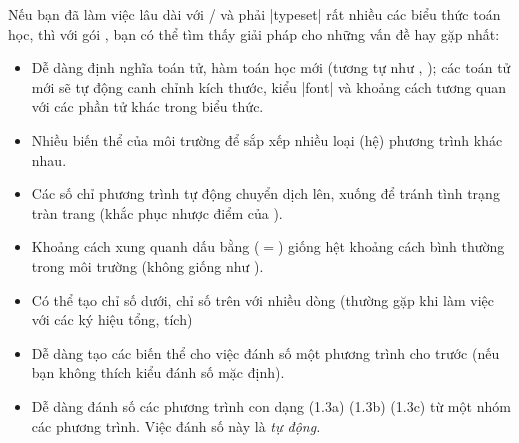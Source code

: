 \documentclass[11pt,leqno,titlepage,openany,oneside]{amsldoc}[1999/12/13]
\begin{document}
\medskip
{}

\bigskip
Nếu bạn đã làm việc lâu dài với \latex/ và phải |typeset| rất nhiều các biểu thức
toán học, thì với gói , bạn có thể tìm thấy giải pháp
cho những vấn đề hay gặp nhất:

\medskip
\begin{itemize}
\item
Dễ dàng định nghĩa toán tử, hàm toán học mới (tương tự như , );
các toán tử mới sẽ tự động canh chỉnh kích thước, kiểu |font|
và khoảng cách tương quan với các phần tử khác trong biểu thức.

\item
Nhiều biến thể của môi trường 
để sắp xếp nhiều loại (hệ) phương trình khác nhau.

\item
Các số chỉ phương trình tự động chuyển dịch lên, xuống để tránh
tình trạng tràn trang (khắc phục nhược điểm của ).

\item
Khoảng cách xung quanh dấu bằng ($=$) giống hệt khoảng cách bình thường
trong môi trường  (không giống như ).

\item
Có thể tạo chỉ số dưới, chỉ số trên với nhiều dòng (thường gặp khi 
làm việc với các ký hiệu tổng, tích)

\item
Dễ dàng tạo các biến thể cho việc đánh số một phương trình cho trước
(nếu bạn không thích kiểu đánh số mặc định).

\item
Dễ dàng đánh số các phương trình con dạng (1.3a) (1.3b) (1.3c)
từ một nhóm các phương trình. Việc đánh số này là \emph{tự động.}
\end{itemize}
\end{document}
